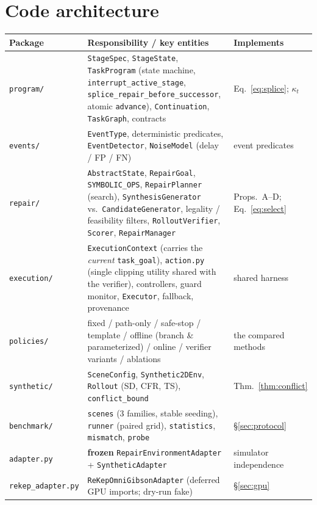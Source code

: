 \documentclass[11pt]{article}
\begin{document}
\section{Code architecture}

\begin{center}
\begin{longtable}{p{}p{}p{}}
\toprule
Package & Responsibility / key entities & Implements \\
\midrule
\endhead
\texttt{program/} & \texttt{StageSpec}, \texttt{StageState},
  \texttt{TaskProgram} (state machine, \texttt{interrupt\_active\_stage},
  \texttt{splice\_repair\_before\_successor}, atomic \texttt{advance}),
  \texttt{Continuation}, \texttt{TaskGraph}, contracts
  & Eq.~\eqref{eq:splice}; $\kappa_t$ \\
\texttt{events/} & \texttt{EventType}, deterministic predicates,
  \texttt{EventDetector}, \texttt{NoiseModel} (delay / FP / FN)
  & event predicates \\
\texttt{repair/} & \texttt{AbstractState}, \texttt{RepairGoal},
  \texttt{SYMBOLIC\_OPS}, \texttt{RepairPlanner} (search),
  \texttt{SynthesisGenerator} vs.\ \texttt{CandidateGenerator},
  legality / feasibility filters, \texttt{RolloutVerifier},
  \texttt{Scorer}, \texttt{RepairManager}
  & Props.~A--D; Eq.~\eqref{eq:select} \\
\texttt{execution/} & \texttt{ExecutionContext} (carries the \emph{current}
  \texttt{task\_goal}), \texttt{action.py} (single clipping utility shared with
  the verifier), controllers, guard monitor, \texttt{Executor},
  fallback, provenance & shared harness \\
\texttt{policies/} & fixed / path-only / safe-stop / template /
  offline (branch \& parameterized) / online / verifier variants / ablations
  & the compared methods \\
\texttt{synthetic/} & \texttt{SceneConfig}, \texttt{Synthetic2DEnv},
  \texttt{Rollout} (SD, CFR, TS), \texttt{conflict\_bound}
  & Thm.~\ref{thm:conflict} \\
\texttt{benchmark/} & \texttt{scenes} (3 families, stable seeding),
  \texttt{runner} (paired grid), \texttt{statistics},
  \texttt{mismatch}, \texttt{probe} & §\ref{sec:protocol} \\
\texttt{adapter.py} & \textbf{frozen} \texttt{RepairEnvironmentAdapter} +
  \texttt{SyntheticAdapter} & simulator independence \\
\texttt{rekep\_adapter.py} & \texttt{ReKepOmniGibsonAdapter} (deferred GPU
  imports; dry-run fake) & §\ref{sec:gpu} \\
\bottomrule
\end{longtable}
\end{center}
\end{document}
